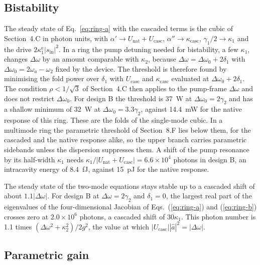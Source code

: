 \documentclass[9pt]{osa-supplemental-document}
\newcommand{\Dom}{\Delta\omega}
\begin{document}
\subsection{Bistability}

The steady state of Eq.~\eqref{eq:ring-a} with the cascaded terms is the cubic
of Section~4.C in photon units, with $\alpha'\to U_{\mathrm{nat}}+U_{\mathrm{casc}}$,
$\alpha''\to\kappa_{\mathrm{casc}}$, $\gamma_1/2\to\kappa_1$ and the drive
$2\kappa_1^{\mathrm e}|s_{\mathrm{in}}|^2$.  In a ring the pump
detuning needed for bistability, a few $\kappa_1$, changes $\Dom$ by an
amount comparable with $\kappa_2$, because $\Dom=\Dom_0+2\delta_1$ with
$\Dom_0=2\omega_a-\omega_2$ fixed by the device.  The threshold is
therefore found by minimising the fold power over $\delta_1$ with
$U_{\mathrm{casc}}$ and $\kappa_{\mathrm{casc}}$ evaluated at $\Dom_0+2\delta_1$.
The condition $\rho<1/\sqrt3$ of Section~4.C then applies to the
pump-frame $\Dom$ and does not restrict $\Dom_0$.  For design B the
threshold is 37~\textmu W at $\Dom_0=2\gamma_2$ and has a shallow minimum
of 32~\textmu W at $\Dom_0=3.3\gamma_2$, against 14.4~mW for the native
response of this ring.  These are the folds of the single-mode cubic.
In a multimode ring the parametric threshold of Section~8.F lies below
them, for the cascaded and the native response alike, so the upper branch
carries parametric sidebands unless the dispersion suppresses them.  A
shift of the pump resonance by its half-width $\kappa_1$ needs
$\kappa_1/|U_{\mathrm{nat}}+U_{\mathrm{casc}}|=6.6\times10^4$ photons in
design B, an intracavity energy of 8.4~fJ, against 15~pJ for the native
response.

The steady state of the two-mode equations stays stable up to a cascaded
shift of about $1.1|\Dom|$.  For design B at $\Dom=2\gamma_2$ and
$\delta_1=0$, the largest real part of the eigenvalues of the
four-dimensional Jacobian of
Eqs.~(\ref{eq:ring-a}) and (\ref{eq:ring-b}) crosses zero at
$2.0\times10^6$ photons, a cascaded shift of $30\kappa_1$.  This photon
number is 1.1 times $(\Dom^2+\kappa_2^2)/2g^2$, the value at which
$|U_{\mathrm{casc}}||\hat a|^2=|\Dom|$.

\subsection{Parametric gain}
\end{document}
